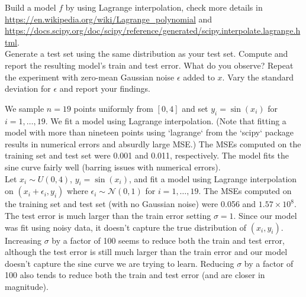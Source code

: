 \documentclass[a4paper]{article}
\theoremstyle{definition}
\newenvironment{soln}{
    \leavevmode\color{blue}\ignorespaces
}{}
\begin{document}
Build a model $f$ by using Lagrange interpolation, check more details in \url{https://en.wikipedia.org/wiki/Lagrange_polynomial} and \url{https://docs.scipy.org/doc/scipy/reference/generated/scipy.interpolate.lagrange.html}. \\

Generate a test set using the same distribution as your test set. Compute and report the resulting model’s train and test error. What do you observe?
Repeat the experiment with zero-mean Gaussian noise $\epsilon$ added to $x$. Vary the standard deviation for $\epsilon$ and report your findings. \\

\begin{soln}
  We sample $n=19$ points uniformly from $[0, 4]$ and set $y_i=\sin(x_i)$ for $i=1,\dots,19$. We fit a model using Lagrange interpolation. (Note that fitting a model with more than nineteen points using `lagrange` from the `scipy` package results in numerical errors and absurdly large MSE.) The MSEs computed on the training set and test set were 0.001 and 0.011, respectively. The model fits the sine curve fairly well (barring issues with numerical errors). \\[1ex]

  Let $x_i \sim U(0, 4)$, $y_i = \sin(x_i)$, and fit a model using Lagrange interpolation on $(x_i + \epsilon_i, y_i)$ where $\epsilon_i \sim \mathcal{N}(0, 1)$ for $i=1,\dots,19$. The MSEs computed on the training set and test set (with no Gaussian noise) were 0.056 and $1.57\times10^{8}$. The test error is much larger than the train error setting $\sigma = 1$. Since our model was fit using noisy data, it doesn't capture the true distribution of $(x_i, y_i)$. Increasing $\sigma$ by a factor of 100 seems to reduce both the train and test error, although the test error is still much larger than the train error and our model doesn't capture the sine curve we are trying to learn. Reducing $\sigma$ by a factor of 100 also tends to reduce both the train and test error (and are closer in magnitude). 
\end{soln}


\end{document}
